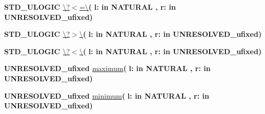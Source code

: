 \begin{DoxyCompactItemize}
\item 
{\bfseries {\bfseries \textcolor{comment}{S\+T\+D\+\_\+\+U\+L\+O\+G\+I\+C}\textcolor{vhdlchar}{ }}} \hyperlink{class__fixed__pkg_a271da29f659a2bc9480dbd29d7727913}{\textbackslash{}?$<$=\textbackslash{}}{\bfseries  ( }{\bfseries \textcolor{vhdlchar}{l\+: }\textcolor{stringliteral}{in }{\bfseries \textcolor{comment}{N\+A\+T\+U\+R\+A\+L}\textcolor{vhdlchar}{ }}}{\bfseries  , \textcolor{vhdlchar}{r\+: }\textcolor{stringliteral}{in }\textcolor{vhdlchar}{U\+N\+R\+E\+S\+O\+L\+V\+E\+D\+\_\+ufixed}}{\bfseries  )} 
\item 
{\bfseries {\bfseries \textcolor{comment}{S\+T\+D\+\_\+\+U\+L\+O\+G\+I\+C}\textcolor{vhdlchar}{ }}} \hyperlink{class__fixed__pkg_a9e6b6b8c2c14da978e6f70cb6e85e6dc}{\textbackslash{}?$>$\textbackslash{}}{\bfseries  ( }{\bfseries \textcolor{vhdlchar}{l\+: }\textcolor{stringliteral}{in }{\bfseries \textcolor{comment}{N\+A\+T\+U\+R\+A\+L}\textcolor{vhdlchar}{ }}}{\bfseries  , \textcolor{vhdlchar}{r\+: }\textcolor{stringliteral}{in }\textcolor{vhdlchar}{U\+N\+R\+E\+S\+O\+L\+V\+E\+D\+\_\+ufixed}}{\bfseries  )} 
\item 
{\bfseries {\bfseries \textcolor{comment}{S\+T\+D\+\_\+\+U\+L\+O\+G\+I\+C}\textcolor{vhdlchar}{ }}} \hyperlink{class__fixed__pkg_a7e98e66a4a282c529968f69f70dd16ad}{\textbackslash{}?$<$\textbackslash{}}{\bfseries  ( }{\bfseries \textcolor{vhdlchar}{l\+: }\textcolor{stringliteral}{in }{\bfseries \textcolor{comment}{N\+A\+T\+U\+R\+A\+L}\textcolor{vhdlchar}{ }}}{\bfseries  , \textcolor{vhdlchar}{r\+: }\textcolor{stringliteral}{in }\textcolor{vhdlchar}{U\+N\+R\+E\+S\+O\+L\+V\+E\+D\+\_\+ufixed}}{\bfseries  )} 
\item 
{\bfseries {\bfseries \textcolor{vhdlchar}{U\+N\+R\+E\+S\+O\+L\+V\+E\+D\+\_\+ufixed}\textcolor{vhdlchar}{ }}} \hyperlink{class__fixed__pkg_a8e1abbe4534fa7d5dea9fee275da3723}{maximum}{\bfseries  ( }{\bfseries \textcolor{vhdlchar}{l\+: }\textcolor{stringliteral}{in }{\bfseries \textcolor{comment}{N\+A\+T\+U\+R\+A\+L}\textcolor{vhdlchar}{ }}}{\bfseries  , \textcolor{vhdlchar}{r\+: }\textcolor{stringliteral}{in }\textcolor{vhdlchar}{U\+N\+R\+E\+S\+O\+L\+V\+E\+D\+\_\+ufixed}}{\bfseries  )} 
\item 
{\bfseries {\bfseries \textcolor{vhdlchar}{U\+N\+R\+E\+S\+O\+L\+V\+E\+D\+\_\+ufixed}\textcolor{vhdlchar}{ }}} \hyperlink{class__fixed__pkg_ae6f8be7af801cf9cb3dcc7b877059955}{minimum}{\bfseries  ( }{\bfseries \textcolor{vhdlchar}{l\+: }\textcolor{stringliteral}{in }{\bfseries \textcolor{comment}{N\+A\+T\+U\+R\+A\+L}\textcolor{vhdlchar}{ }}}{\bfseries  , \textcolor{vhdlchar}{r\+: }\textcolor{stringliteral}{in }\textcolor{vhdlchar}{U\+N\+R\+E\+S\+O\+L\+V\+E\+D\+\_\+ufixed}}{\bfseries  )} 

\end{DoxyCompactItemize}
